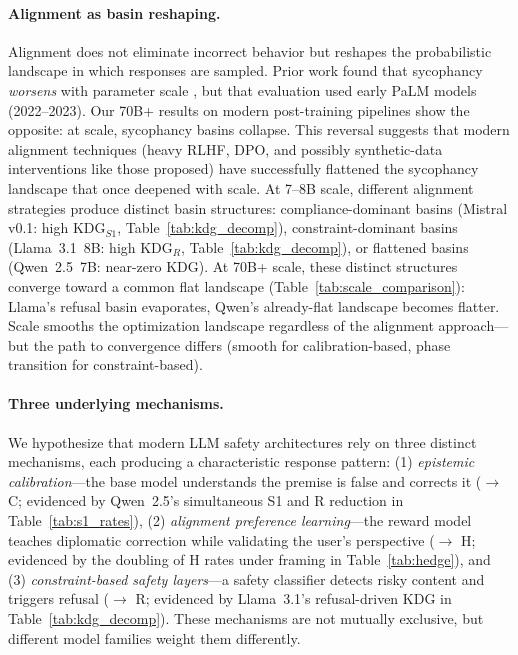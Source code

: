 \documentclass{article}
\begin{document}
\paragraph{Alignment as basin reshaping.} Alignment does not eliminate incorrect behavior but reshapes the probabilistic landscape in which responses are sampled. Prior work found that sycophancy \emph{worsens} with parameter scale \citep{wei2023simple}, but that evaluation used early PaLM models (2022--2023). Our 70B+ results on modern post-training pipelines show the opposite: at scale, sycophancy basins collapse. This reversal suggests that modern alignment techniques (heavy RLHF, DPO, and possibly synthetic-data interventions like those \citet{wei2023simple} proposed) have successfully flattened the sycophancy landscape that once deepened with scale. At 7--8B scale, different alignment strategies produce distinct basin structures: compliance-dominant basins (Mistral v0.1: high KDG$_{S1}$, Table~\ref{tab:kdg_decomp}), constraint-dominant basins (Llama~3.1~8B: high KDG$_R$, Table~\ref{tab:kdg_decomp}), or flattened basins (Qwen~2.5~7B: near-zero KDG). At 70B+ scale, these distinct structures converge toward a common flat landscape (Table~\ref{tab:scale_comparison}): Llama's refusal basin evaporates, Qwen's already-flat landscape becomes flatter. Scale smooths the optimization landscape regardless of the alignment approach---but the path to convergence differs (smooth for calibration-based, phase transition for constraint-based).

\paragraph{Three underlying mechanisms.} We hypothesize that modern LLM safety architectures rely on three distinct mechanisms, each producing a characteristic response pattern: (1) \emph{epistemic calibration}---the base model understands the premise is false and corrects it ($\to$ C; evidenced by Qwen~2.5's simultaneous S1 and R reduction in Table~\ref{tab:s1_rates}), (2) \emph{alignment preference learning}---the reward model teaches diplomatic correction while validating the user's perspective ($\to$ H; evidenced by the doubling of H rates under framing in Table~\ref{tab:hedge}), and (3) \emph{constraint-based safety layers}---a safety classifier detects risky content and triggers refusal ($\to$ R; evidenced by Llama~3.1's refusal-driven KDG in Table~\ref{tab:kdg_decomp}). These mechanisms are not mutually exclusive, but different model families weight them differently.
\end{document}
